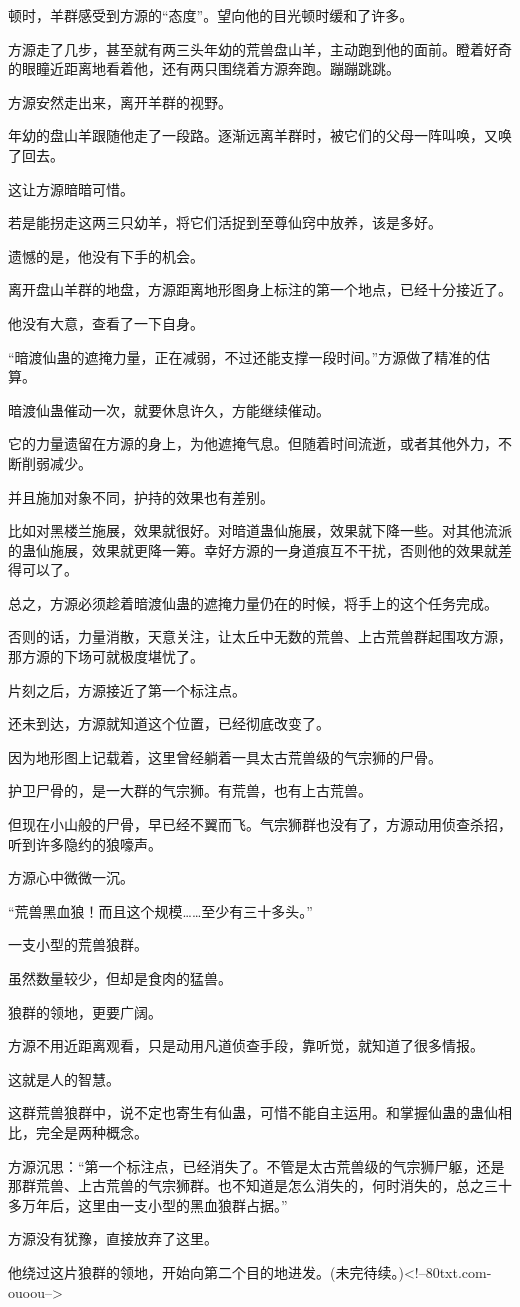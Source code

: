 \begin{this_body}
顿时，羊群感受到方源的“态度”。望向他的目光顿时缓和了许多。

方源走了几步，甚至就有两三头年幼的荒兽盘山羊，主动跑到他的面前。瞪着好奇的眼瞳近距离地看着他，还有两只围绕着方源奔跑。蹦蹦跳跳。

方源安然走出来，离开羊群的视野。

年幼的盘山羊跟随他走了一段路。逐渐远离羊群时，被它们的父母一阵叫唤，又唤了回去。

这让方源暗暗可惜。

若是能拐走这两三只幼羊，将它们活捉到至尊仙窍中放养，该是多好。

遗憾的是，他没有下手的机会。

离开盘山羊群的地盘，方源距离地形图身上标注的第一个地点，已经十分接近了。

他没有大意，查看了一下自身。

“暗渡仙蛊的遮掩力量，正在减弱，不过还能支撑一段时间。”方源做了精准的估算。

暗渡仙蛊催动一次，就要休息许久，方能继续催动。

它的力量遗留在方源的身上，为他遮掩气息。但随着时间流逝，或者其他外力，不断削弱减少。

并且施加对象不同，护持的效果也有差别。

比如对黑楼兰施展，效果就很好。对暗道蛊仙施展，效果就下降一些。对其他流派的蛊仙施展，效果就更降一筹。幸好方源的一身道痕互不干扰，否则他的效果就差得可以了。

总之，方源必须趁着暗渡仙蛊的遮掩力量仍在的时候，将手上的这个任务完成。

否则的话，力量消散，天意关注，让太丘中无数的荒兽、上古荒兽群起围攻方源，那方源的下场可就极度堪忧了。

片刻之后，方源接近了第一个标注点。

还未到达，方源就知道这个位置，已经彻底改变了。

因为地形图上记载着，这里曾经躺着一具太古荒兽级的气宗狮的尸骨。

护卫尸骨的，是一大群的气宗狮。有荒兽，也有上古荒兽。

但现在小山般的尸骨，早已经不翼而飞。气宗狮群也没有了，方源动用侦查杀招，听到许多隐约的狼嚎声。

方源心中微微一沉。

“荒兽黑血狼！而且这个规模……至少有三十多头。”

一支小型的荒兽狼群。

虽然数量较少，但却是食肉的猛兽。

狼群的领地，更要广阔。

方源不用近距离观看，只是动用凡道侦查手段，靠听觉，就知道了很多情报。

这就是人的智慧。

这群荒兽狼群中，说不定也寄生有仙蛊，可惜不能自主运用。和掌握仙蛊的蛊仙相比，完全是两种概念。

方源沉思：“第一个标注点，已经消失了。不管是太古荒兽级的气宗狮尸躯，还是那群荒兽、上古荒兽的气宗狮群。也不知道是怎么消失的，何时消失的，总之三十多万年后，这里由一支小型的黑血狼群占据。”

方源没有犹豫，直接放弃了这里。

他绕过这片狼群的领地，开始向第二个目的地进发。(未完待续。)<!--80txt.com-ouoou-->

\end{this_body}

